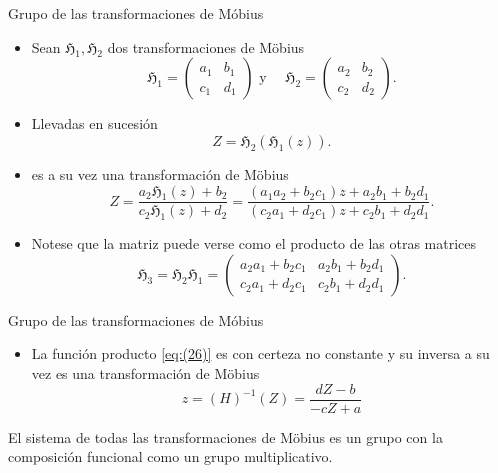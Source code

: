 \documentclass{beamer}
\newenvironment{Teorema}[1]{
  \begin{tcolorbox}[colback=blockbackground,colframe=ritsumeikan,title=#1]
}{
  \end{tcolorbox}
}
\begin{document}
\begin{frame}{Grupo de las transformaciones de Móbius}
    \begin{itemize}
        \item Sean $\mathfrak{H}_1,\mathfrak{H}_2$ dos transformaciones de Möbius
        \begin{equation*}
            \mathfrak{H}_1=
            \begin{pmatrix}
                a_1 & b_1\\
                c_1 & d_1
            \end{pmatrix}
            \text { y } 
            \quad
            \mathfrak{H}_2=
            \begin{pmatrix}
                a_2 & b_2\\
                c_2 & d_2
            \end{pmatrix}.
        \end{equation*}
        \item Llevadas en sucesión
        \begin{equation}
            Z=\mathfrak{H}_2(\mathfrak{H}_1(z)).
            \label{eq:(26)}
        \end{equation}
        \item es a su vez una transformación de Möbius
        \begin{equation*}
            Z=\frac{a_2\mathfrak{H}_1(z)+b_2}{c_2\mathfrak{H}_1(z)+d_2}=\frac{(a_1a_2+b_2c_1)z+a_2b_1+b_2d_1}{(c_2a_1+d_2c_1)z+c_2b_1+d_2d_1}.
        \end{equation*}
        \item Notese que la matriz puede verse como el producto de las otras matrices
        \begin{equation}
            \mathfrak{H}_3=\mathfrak{H}_2\mathfrak{H}_1=
            \begin{pmatrix}
                a_2a_1+b_2c_1 & a_2b_1+b_2d_1\\
                c_2a_1+d_2c_1 & c_2b_1+d_2d_1
            \end{pmatrix}.
            \label{eq:(27)}
        \end{equation}
    \end{itemize}
\end{frame}

\begin{frame}{Grupo de las transformaciones de Móbius}
    \begin{itemize}
        \item La función producto \eqref{eq:(26)} es con certeza no constante y su inversa a su vez es una transformación de Möbius
        \begin{equation}
            z=(H)^{-1}(Z)=\frac{dZ-b}{-cZ+a}
            \label{eq:(28)}
        \end{equation}
    \end{itemize}
    \begin{Teorema}{Teorema}
        El sistema de todas las transformaciones de Möbius es un grupo con la composición funcional como un grupo multiplicativo.
    \end{Teorema}
\end{frame}
\end{document}
